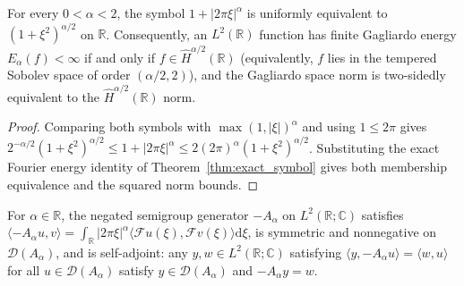 \begin{theorem}\label{thm:sobolev_equal}
\leanok
For every $0 < \alpha < 2$, the symbol $1 + \lvert 2\pi\xi \rvert^\alpha$ is uniformly equivalent to $(1 + \xi^2)^{\alpha/2}$ on $\mathbb{R}$. Consequently, an $L^2(\mathbb{R})$ function has finite Gagliardo energy $E_\alpha(f) < \infty$ if and only if $f \in \widehat{H}^{\alpha/2}(\mathbb{R})$ (equivalently, $f$ lies in the tempered Sobolev space of order $(\alpha/2, 2)$), and the Gagliardo space norm is two-sidedly equivalent to the $\widehat{H}^{\alpha/2}(\mathbb{R})$ norm.
\end{theorem}

\begin{proof}
\leanok
Comparing both symbols with $\max(1,\lvert \xi\rvert)^\alpha$ and using $1 \le 2\pi$ gives $2^{-\alpha/2}(1+\xi^2)^{\alpha/2} \le 1 + \lvert 2\pi\xi \rvert^\alpha \le 2(2\pi)^\alpha(1+\xi^2)^{\alpha/2}$. Substituting the exact Fourier energy identity of Theorem~\ref{thm:exact_symbol} gives both membership equivalence and the squared norm bounds.
\end{proof}

\begin{theorem}\label{thm:frac_lap_selfadjoint}
\leanok
For $\alpha \in \mathbb{R}$, the negated semigroup generator $-A_\alpha$ on $L^2(\mathbb{R}; \mathbb{C})$ satisfies $\langle -A_\alpha u, v \rangle = \int_{\mathbb{R}} \lvert 2\pi\xi \rvert^\alpha \langle \mathcal{F}u(\xi), \mathcal{F}v(\xi) \rangle \mathrm{d}\xi$, is symmetric and nonnegative on $\mathcal{D}(A_\alpha)$, and is self-adjoint: any $y, w \in L^2(\mathbb{R}; \mathbb{C})$ satisfying $\langle y, -A_\alpha u \rangle = \langle w, u \rangle$ for all $u \in \mathcal{D}(A_\alpha)$ satisfy $y \in \mathcal{D}(A_\alpha)$ and $-A_\alpha y = w$.
\end{theorem}

